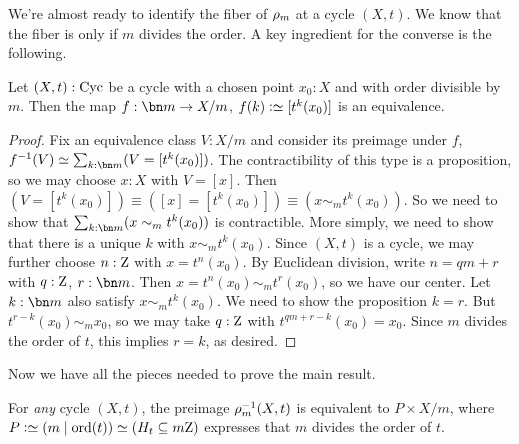 We're almost ready to identify the fiber of $\rho_{m}$ at a cycle $(X,t)$.
We know that the fiber is \nonempty only if $m$ divides the order.
A key ingredient for the converse is the following.
\begin{lemma}\label{lem:X-mod-m-chosen}
  Let $(X,t):\mathrm{Cyc}$ be a cycle with a chosen point $x_0:X$
  and with order divisible by $m$.
  Then the map $f : \bn m \to X/m$, $f(k) \defeq [t^k(x_0)]$
  is an equivalence.
\end{lemma}
\begin{proof}
  Fix an equivalence class $V:X/m$ and consider its preimage under $f$,
  $f^{-1}(V) \jdeq \sum_{k:\bn m}(V=[t^k(x_0)])$.
  The contractibility of this type is a proposition, so we may choose
  $x:X$ with $V=[x]$.
  Then $(V=[t^k(x_0)])\equiv([x]=[t^k(x_0)])\equiv(x\sim_m t^k(x_0))$.
  So we need to show that $\sum_{k:\bn m}(x\sim_m t^k(x_0))$ is contractible.
  More simply, we need to show that there is a unique $k$ with $x\sim_m t^k(x_0)$.
  Since $(X,t)$ is a cycle, we may further choose $n:\mathrm{Z}$ with $x=t^n(x_0)$.
  By Euclidean division, write $n=qm+r$ with $q:\mathrm{Z}$, $r:\bn m$.
  Then $x = t^n(x_0) \sim_m t^r(x_0)$, so we have our center.
  Let $k:\bn m$ also satisfy $x\sim_m t^k(x_0)$.
  We need to show the proposition $k=r$.
  But $t^{r-k}(x_0) \sim_m x_0$, so we may take $q:\mathrm{Z}$ with $t^{qm+r-k}(x_0)=x_0$.
  Since $m$ divides the order of $t$, this implies $r=k$, as desired.
\end{proof}
Now we have all the pieces needed to prove the main result.
\begin{theorem}\label{thm:fiber-cdg}
  For \emph{any} cycle $(X,t)$, the preimage $\rho_{m}^{-1}(X,t)$
  is equivalent to $P\times X/m$,
  where $P\defeq (m \mid \ord(t)) \jdeq (H_t \subseteq m\zet)$
  expresses that $m$ divides the order of $t$.
\end{theorem}
